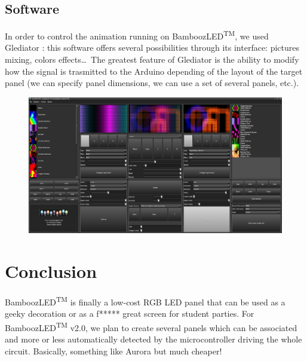 \documentclass[a4paper,12pt]{article}
\begin{document}
\subsection{Software}
In order to control the animation running on BamboozLED\textsuperscript{TM}, we used Glediator \cite{glediator}: this software offers several possibilities through its interface: pictures mixing, colors effects\ldots~The greatest feature of Glediator is the ability to modify how the signal is trasmitted to the Arduino depending of the layout of the target panel (we can specify panel dimensions, we can use a set of several panels, etc.).
\begin{figure}[htbp]
	\centering
	\includegraphics[width=\textwidth]{img/glediator}
\end{figure}

\section{Conclusion}
BamboozLED\textsuperscript{TM} is finally a low-cost RGB LED panel that can be used as a geeky decoration or as a f***** great screen for student parties. For BamboozLED\textsuperscript{TM} v2.0, we plan to create several panels which can be associated and more or less automatically detected by the microcontroller driving the whole circuit. Basically, something like Aurora \cite{aurora} but much cheaper!
\newpage


\end{document}

